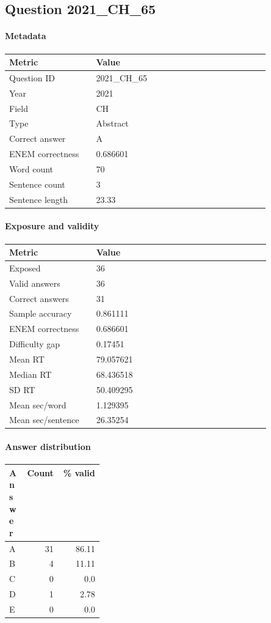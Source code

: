 \subsection*{Question 2021\_CH\_65}
\label{sec:q_2021_CH_65}
\paragraph{Metadata}
\begin{tabular}{p{0.30\linewidth}p{0.60\linewidth}}
\toprule
Metric & Value\\
\midrule
Question ID & 2021\_CH\_65\\
Year & 2021\\
Field & CH\\
Type & Abstract\\
Correct answer & A\\
ENEM correctness & 0.686601\\
Word count & 70\\
Sentence count & 3\\
Sentence length & 23.33\\
\bottomrule
\end{tabular}

\paragraph{Exposure and validity}
\begin{tabular}{p{0.30\linewidth}p{0.60\linewidth}}
\toprule
Metric & Value\\
\midrule
Exposed & 36\\
Valid answers & 36\\
Correct answers & 31\\
Sample accuracy & 0.861111\\
ENEM correctness & 0.686601\\
Difficulty gap & 0.17451\\
Mean RT & 79.057621\\
Median RT & 68.436518\\
SD RT & 50.409295\\
Mean sec/word & 1.129395\\
Mean sec/sentence & 26.35254\\
\bottomrule
\end{tabular}

\paragraph{Answer distribution}
\begin{tabular}{p{0.18\linewidth}rr}
\toprule
Answer & Count & \% valid\\
\midrule
A & 31 & 86.11\\
B & 4 & 11.11\\
C & 0 & 0.0\\
D & 1 & 2.78\\
E & 0 & 0.0\\
\bottomrule
\end{tabular}

